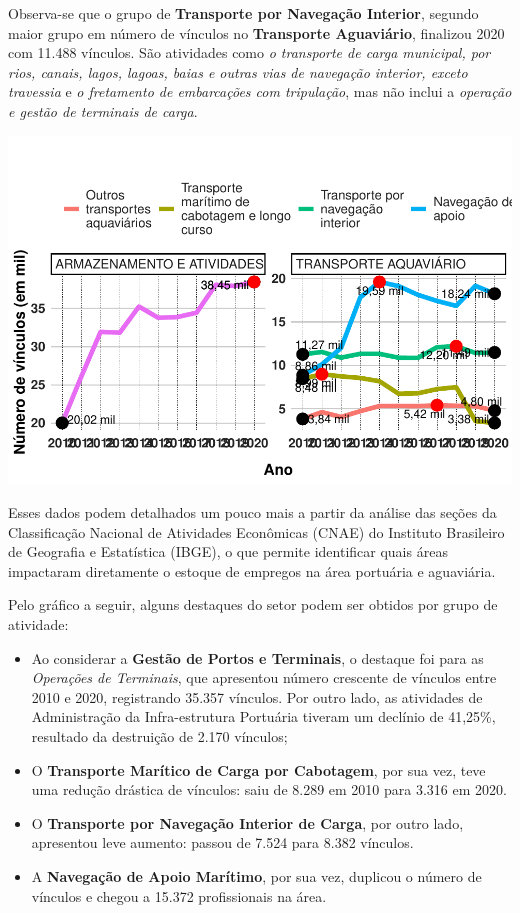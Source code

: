 \documentclass[
]{article}
\begin{document}
Observa-se que o grupo de \textbf{Transporte por Navegação Interior},
segundo maior grupo em número de vínculos no \textbf{Transporte
Aguaviário}, finalizou 2020 com 11.488 vínculos. São atividades como
\emph{o transporte de carga municipal, por rios, canais, lagos, lagoas,
baias e outras vias de navegação interior, exceto travessia} e \emph{o
fretamento de embarcações com tripulação}, mas não inclui a
\emph{operação e gestão de terminais de carga}.

\hfill\break

\includegraphics{mercado_trabalho_files/figure-latex/g_grupo-1.pdf}

Esses dados podem detalhados um pouco mais a partir da análise das
seções da Classificação Nacional de Atividades Econômicas (CNAE) do
Instituto Brasileiro de Geografia e Estatística (IBGE), o que permite
identificar quais áreas impactaram diretamente o estoque de empregos na
área portuária e aguaviária.

Pelo gráfico a seguir, alguns destaques do setor podem ser obtidos por
grupo de atividade:

\begin{itemize}
\item
  Ao considerar a \textbf{Gestão de Portos e Terminais}, o destaque foi
  para as \emph{Operações de Terminais}, que apresentou número crescente
  de vínculos entre 2010 e 2020, registrando 35.357 vínculos. Por outro
  lado, as atividades de Administração da Infra-estrutura Portuária
  tiveram um declínio de 41,25\%, resultado da destruição de 2.170
  vínculos;
\item
  O \textbf{Transporte Marítico de Carga por Cabotagem}, por sua vez,
  teve uma redução drástica de vínculos: saiu de 8.289 em 2010 para
  3.316 em 2020.
\item
  O \textbf{Transporte por Navegação Interior de Carga}, por outro lado,
  apresentou leve aumento: passou de 7.524 para 8.382 vínculos.
\item
  A \textbf{Navegação de Apoio Marítimo}, por sua vez, duplicou o número
  de vínculos e chegou a 15.372 profissionais na área.
\end{itemize}
\end{document}
